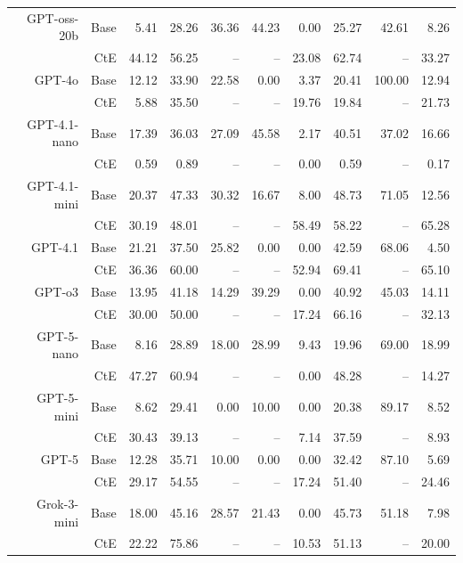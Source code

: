 \begin{table}[!t]
\begin{tabular}{r r !{\color{white!80!black} \vline} r r r r r !{\color{white!80!black} \vline} r r r}
\midrule
\sf GPT-oss-20b & Base & 5.41 & 28.26 & 36.36 & 44.23 & 0.00 & 25.27 & 42.61 & 8.26 \\
 & CtE & 44.12 & 56.25 & -- & -- & 23.08 & 62.74 & -- & 33.27 \\
\midrule
\sf GPT-4o & Base & 12.12 & 33.90 & 22.58 & 0.00 & 3.37 & 20.41 & 100.00 & 12.94 \\
 & CtE & 5.88 & 35.50 & -- & -- & 19.76 & 19.84 & -- & 21.73 \\
\midrule
\sf GPT-4.1-nano & Base & 17.39 & 36.03 & 27.09 & 45.58 & 2.17 & 40.51 & 37.02 & 16.66 \\
 & CtE & 0.59 & 0.89 & -- & -- & 0.00 & 0.59 & -- & 0.17 \\
\midrule
\sf GPT-4.1-mini & Base & 20.37 & 47.33 & 30.32 & 16.67 & 8.00 & 48.73 & 71.05 & 12.56 \\
 & CtE & 30.19 & 48.01 & -- & -- & 58.49 & 58.22 & -- & 65.28 \\
\midrule
\sf GPT-4.1 & Base & 21.21 & 37.50 & 25.82 & 0.00 & 0.00 & 42.59 & 68.06 & 4.50 \\
 & CtE & 36.36 & 60.00 & -- & -- & 52.94 & 69.41 & -- & 65.10 \\
\midrule
\sf GPT-o3 & Base & 13.95 & 41.18 & 14.29 & 39.29 & 0.00 & 40.92 & 45.03 & 14.11 \\
 & CtE & 30.00 & 50.00 & -- & -- & 17.24 & 66.16 & -- & 32.13 \\
\midrule
\sf GPT-5-nano & Base & 8.16 & 28.89 & 18.00 & 28.99 & 9.43 & 19.96 & 69.00 & 18.99 \\
 & CtE & 47.27 & 60.94 & -- & -- & 0.00 & 48.28 & -- & 14.27 \\
\midrule
\sf GPT-5-mini & Base & 8.62 & 29.41 & 0.00 & 10.00 & 0.00 & 20.38 & 89.17 & 8.52 \\
 & CtE & 30.43 & 39.13 & -- & -- & 7.14 & 37.59 & -- & 8.93 \\
\midrule
\sf GPT-5 & Base & 12.28 & 35.71 & 10.00 & 0.00 & 0.00 & 32.42 & 87.10 & 5.69 \\
 & CtE & 29.17 & 54.55 & -- & -- & 17.24 & 51.40 & -- & 24.46 \\
\midrule
\sf Grok-3-mini & Base & 18.00 & 45.16 & 28.57 & 21.43 & 0.00 & 45.73 & 51.18 & 7.98 \\
 & CtE & 22.22 & 75.86 & -- & -- & 10.53 & 51.13 & -- & 20.00 \\
\bottomrule
\end{tabular}
\label{tab:cRi-}
\end{table}